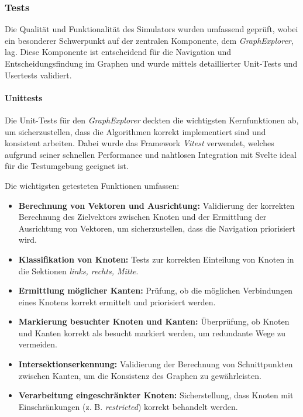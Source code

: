 \documentclass[main.tex]{subfiles} %
\begin{document}
\subsubsection{Tests}

Die Qualität und Funktionalität des Simulators wurden umfassend
geprüft, wobei ein besonderer Schwerpunkt auf der zentralen
Komponente, dem \textit{GraphExplorer}, lag. Diese Komponente ist
entscheidend für die Navigation und Entscheidungsfindung im Graphen
und wurde mittels detaillierter Unit-Tests und Usertests validiert.

\paragraph{Unittests}

Die Unit-Tests für den \textit{GraphExplorer} deckten die wichtigsten
Kernfunktionen ab, um sicherzustellen, dass die Algorithmen korrekt
implementiert sind und konsistent arbeiten. Dabei wurde das Framework
\textit{Vitest} verwendet, welches aufgrund seiner schnellen
Performance und nahtlosen Integration mit Svelte ideal für die
Testumgebung geeignet ist.

Die wichtigsten getesteten Funktionen umfassen:
\begin{itemize}
  \item \textbf{Berechnung von Vektoren und Ausrichtung:} Validierung
    der korrekten Berechnung des Zielvektors zwischen Knoten und der
    Ermittlung der Ausrichtung von Vektoren, um sicherzustellen, dass
    die Navigation priorisiert wird.
  \item \textbf{Klassifikation von Knoten:} Tests zur korrekten
    Einteilung von Knoten in die Sektionen \textit{links, rechts, Mitte}.
  \item \textbf{Ermittlung möglicher Kanten:} Prüfung, ob die
    möglichen Verbindungen eines Knotens korrekt ermittelt und
    priorisiert werden.
  \item \textbf{Markierung besuchter Knoten und Kanten:} Überprüfung,
    ob Knoten und Kanten korrekt als besucht markiert werden, um
    redundante Wege zu vermeiden.
  \item \textbf{Intersektionserkennung:} Validierung der Berechnung
    von Schnittpunkten zwischen Kanten, um die Konsistenz des Graphen
    zu gewährleisten.
  \item \textbf{Verarbeitung eingeschränkter Knoten:} Sicherstellung,
    dass Knoten mit Einschränkungen (z. B. \textit{restricted})
    korrekt behandelt werden.
\end{itemize}
\end{document}
